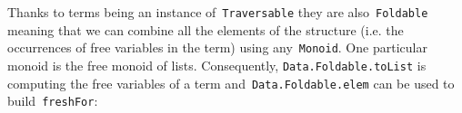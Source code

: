 \documentclass[9pt,preprint,authoryear]{sigplanconf}
\begin{document}
%
Thanks to terms being an instance of{~}\textcolor[rgb]{0,0,0.80}{\texttt{Traversable}} they are
    also{~}\textcolor[rgb]{0,0,0.80}{\texttt{Foldable}} meaning that we can combine all the elements of
    the structure (i.e. the occurrences of free variables in the term)
    using any{~}\textcolor[rgb]{0,0,0.80}{\texttt{Monoid}}. One particular monoid is the free monoid of
    lists. Consequently, \textcolor[rgb]{0,0,0.80}{\texttt{Data.Foldable.toList}} is computing the
    free variables of a term and{~}\textcolor[rgb]{0,0,0.80}{\texttt{Data.Foldable.elem}} can be used to
    build{~}\textcolor[rgb]{0,0,0.80}{\texttt{freshFor}}{:}%


{\nopagebreak }

%
%
%
%
\end{document}
